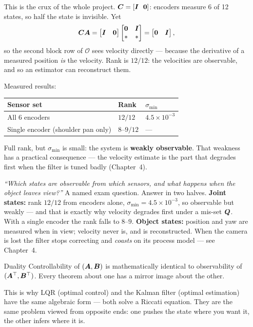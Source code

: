 \begin{inproject}
This is the crux of the whole project. $\bm{C} = [\bm{I}\ \ \bm{0}]$: encoders measure 6 of 12 states, so half
the state is invisible. Yet
\[
\bm{C}\bm{A} = \begin{bmatrix}\bm{I} & \bm{0}\end{bmatrix}
\begin{bmatrix}\bm{0} & \bm{I} \\ \ast & \ast\end{bmatrix} = \begin{bmatrix}\bm{0} & \bm{I}\end{bmatrix},
\]
so the second block row of $\mathcal{O}$ sees velocity directly --- because the derivative of a measured
position \emph{is} the velocity. Rank is $12/12$: the velocities are observable, and so an estimator can
reconstruct them.

Measured results:
\begin{center}
\begin{tabular}{@{}lll@{}}
\toprule
Sensor set & Rank & $\sigma_{\min}$ \\
\midrule
All 6 encoders & $12/12$ & $4.5 \times 10^{-3}$ \\
Single encoder (shoulder pan only) & $8$--$9 / 12$ & --- \\
\bottomrule
\end{tabular}
\end{center}
Full rank, but $\sigma_{\min}$ is small: the system is \textbf{weakly observable}. That weakness has a
practical consequence --- the velocity estimate is the part that degrades first when the filter is tuned
badly (Chapter~4).
\end{inproject}

\begin{vivabox}
\emph{``Which states are observable from which sensors, and what happens when the object leaves view?''}
A named exam question. Answer in two halves. \textbf{Joint states:} rank $12/12$ from encoders alone,
$\sigma_{\min} = 4.5\times10^{-3}$, so observable but weakly --- and that is exactly why velocity degrades
first under a mis-set $\bm{Q}$. With a single encoder the rank falls to $8$--$9$. \textbf{Object states:}
position and yaw are measured when in view; velocity never is, and is reconstructed. When the camera is
lost the filter stops correcting and \emph{coasts} on its process model --- see Chapter~4.
\end{vivabox}

\begin{definition}{Duality}
Controllability of $(\bm{A}, \bm{B})$ is mathematically identical to observability of $(\bm{A}^\top, \bm{B}^\top)$.
Every theorem about one has a mirror image about the other.
\end{definition}

\begin{intuition}
This is why LQR (optimal control) and the Kalman filter (optimal estimation) have the same algebraic
form --- both solve a Riccati equation. They are the same problem viewed from opposite ends: one pushes
the state where you want it, the other infers where it is.
\end{intuition}
